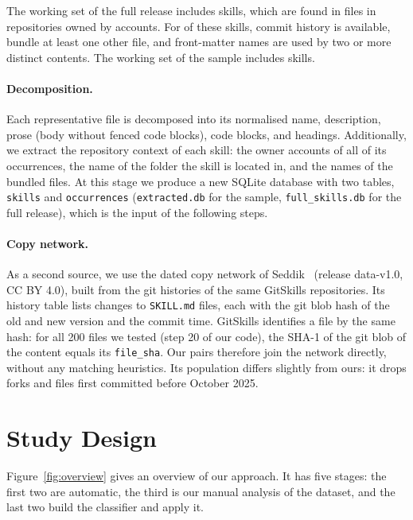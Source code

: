 \documentclass[sigconf,screen]{acmart}
\begin{document}
The working set of the full release includes \ResFullWorkContents{} skills, which are found in \ResFullWorkOcc{} files in \ResFullWorkRepos{} repositories owned by \ResFullWorkOwners{} accounts. For \ResFullWorkHistory{} of these skills, commit history is available, \ResFullWorkSiblings{} bundle at least one other file, and \ResFullNamesTwoPlus{} front-matter names are used by two or more distinct contents. The working set of the sample includes \ResWorkContents{} skills.

\paragraph{Decomposition.} Each representative file is decomposed into its normalised name, description, prose (body without fenced code blocks), code blocks, and headings. Additionally, we extract the repository context of each skill: the owner accounts of all of its occurrences, the name of the folder the skill is located in, and the names of the bundled files. At this stage we produce a new SQLite database with two tables, \texttt{skills} and \texttt{occurrences} (\texttt{extracted.db} for the sample, \texttt{full\_skills.db} for the full release), which is the input of the following steps.

\paragraph{Copy network.} As a second source, we use the dated copy network of Seddik~\cite{seddik2026constellations} (release data-v1.0, CC BY 4.0), built from the git histories of the same GitSkills repositories. Its history table lists \ResCNHistoryRows{} changes to \texttt{SKILL.md} files, each with the git blob hash of the old and new version and the commit time. GitSkills identifies a file by the same hash: for all 200 files we tested (step 20 of our code), the SHA-1 of the git blob of the content equals its \texttt{file\_sha}. Our pairs therefore join the network directly, without any matching heuristics. Its population differs slightly from ours: it drops forks and files first committed before October 2025.


\section{Study Design}
\label{sec:design}

Figure~\ref{fig:overview} gives an overview of our approach. It has five stages: the first two are automatic, the third is our manual analysis of the dataset, and the last two build the classifier and apply it.
\end{document}
